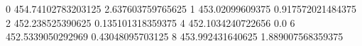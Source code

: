0 454.74102783203125 2.637603759765625
1 453.02099609375 0.917572021484375
2 452.238525390625 0.135101318359375
4 452.1034240722656 0.0
6 452.5339050292969 0.43048095703125
8 453.992431640625 1.889007568359375
